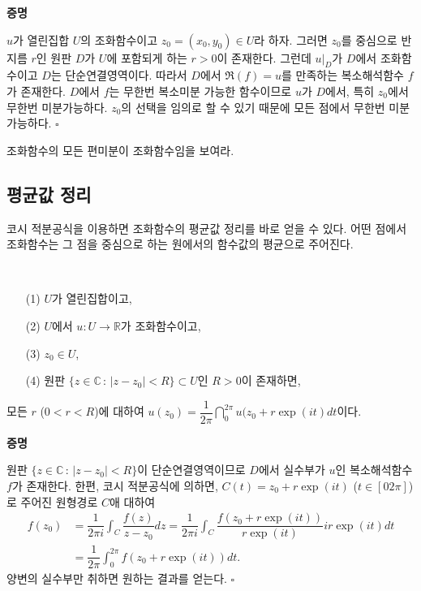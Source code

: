{\bf 증명}

$u$가 열린집합 $U$의 조화함수이고 $z_0=(x_0,y_0) \in U$라 하자.
그러면 $z_0$를 중심으로 반지름 $r$인 원판 $D$가 $U$에  포함되게 하는 $r>0$이 존재한다.
그런데 $u|_D$가 $D$에서 조화함수이고 $D$는 단순연결영역이다.
따라서 $D$에서 $\Re(f)=u$를 만족하는 복소해석함수 $f$가 존재한다.
$D$에서 $f$는 무한번 복소미분 가능한 함수이므로
$u$가 $D$에서, 특히 $z_0$에서 무한번 미분가능하다.
$z_0$의 선택을 임의로 할 수 있기 때문에 모든 점에서 무한번 미분가능하다.
\hfill $\square$

\begin{salt_exercise}\label{ex-5-7}
조화함수의 모든 편미분이 조화함수임을 보여라.
\end{salt_exercise}

\subsection{평균값 정리}

코시 적분공식을 이용하면
조화함수의 평균값 정리를 바로 얻을 수 있다.
어떤 점에서 조화함수는 그 점을 중심으로 하는 원에서의 함수값의 평균으로 주어진다.

\begin{salt_theorem}  \label{thm-5-3}
\
\begin{itemize}
\item[(1)] $U$가 열린집합이고,
\item[(2)] $U$에서 $u:U\to\mathbb R$가 조화함수이고,
\item[(3)] $z_0\in U$,
\item[(4)] 원판 $\{ z\in\mathbb C\,:\, |z-z_0|<R \} \subset U$인 $R>0$이 존재하면,
\end{itemize}
모든 $r$ ($0<r<R$)에 대하여
$u(z_0) = \dfrac1{2\pi} \dint_0^{2\pi} u(z_0 + r\exp(it)dt$이다.
\end{salt_theorem}

{\bf 증명}

원판 $\{ z\in\mathbb C\,:\, |z-z_0|<R \} $이 단순연결영역이므로
$D$에서 실수부가 $u$인 복소해석함수 $f$가 존재한다.
한편, 코시 적분공식에 의하면, 
$C(t) = z_0 + r\exp(it)$ ($t\in[02\pi]$)로 주어진 원형경로 $C$애 대하여 
\begin{align*}
f(z_0) &= \dfrac1{2\pi i} \int_C \dfrac{f(z)}{z-z_0} dz
= \dfrac1{2\pi i} \int_C \dfrac{f(z_0+r\exp(it))}{r\exp(it)} ir\exp(it) dt\\
&= \dfrac1{2\pi} \int_0^{2\pi} f(z_0+r\exp(it)) dt.
\end{align*}
양변의 실수부만 취하면 원하는 결과를 얻는다.
\hfill $\square$

